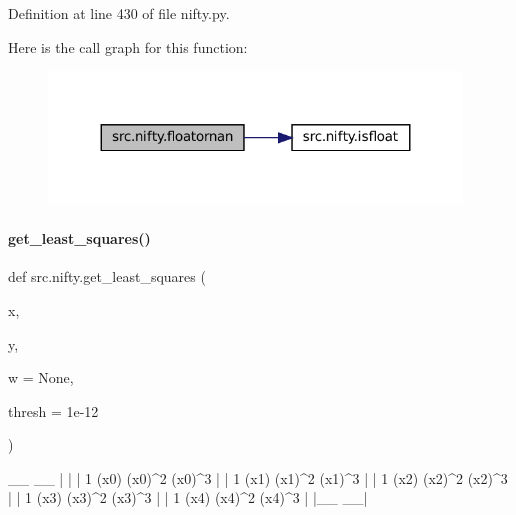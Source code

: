 Definition at line 430 of file nifty.\+py.

Here is the call graph for this function\+:
\nopagebreak
\begin{figure}[H]
\begin{center}
\leavevmode
\includegraphics[width=311pt]{namespacesrc_1_1nifty_a1adc158bdcdb57c642f95d5e015bc881_cgraph}
\end{center}
\end{figure}
\mbox{\label{namespacesrc_1_1nifty_a83182c45477fe8ec241bedad494dc0a9}} 
\paragraph{\texorpdfstring{get\+\_\+least\+\_\+squares()}{get\_least\_squares()}}
{\footnotesize\ttfamily def src.\+nifty.\+get\+\_\+least\+\_\+squares (\begin{DoxyParamCaption}\item[{}]{x,  }\item[{}]{y,  }\item[{}]{w = {\ttfamily None},  }\item[{}]{thresh = {\ttfamily 1e-\/12} }\end{DoxyParamCaption})}


\begin{DoxyCode}
 \_\_                  \_\_
|                      |
| 1 (x0) (x0)^2 (x0)^3 |
| 1 (x1) (x1)^2 (x1)^3 |
| 1 (x2) (x2)^2 (x2)^3 |
| 1 (x3) (x3)^2 (x3)^3 |
| 1 (x4) (x4)^2 (x4)^3 |
|\_\_                  \_\_|
\end{DoxyCode}



